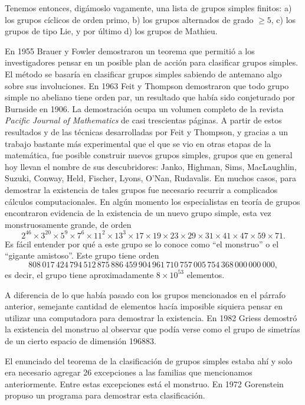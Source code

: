 Tenemos entonces,
digámoslo vagamente, una lista de grupos simples finitos: a) los grupos
cíclicos de orden primo, b) los grupos alternados de grado $\geq 5$, c) los
grupos de tipo Lie, y por último d) los grupos de Mathieu. 

En 1955 Brauer y Fowler demostraron un teorema que permitió a los investigadores
pensar en un posible plan de acción para clasificar grupos simples. El método 
se basaría en clasificar grupos simples sabiendo de antemano algo sobre sus 
involuciones.  
En 1963 Feit y Thompson demostraron que todo grupo simple no abeliano tiene orden par, 
un resultado que había sido conjeturado por Burnside en 1906. La demostración ocupa
un volumen completo de la revista \emph{Pacific Journal of Mathematics} de casi
trescientas páginas. A partir de estos resultados y de las técnicas desarrolladas
por Feit y Thompson, y gracias a un trabajo bastante más experimental 
que el que se vio en otras etapas de la matemática, 
fue posible construir nuevos grupos simples, grupos que en
general hoy llevan el nombre de sus descubridores: Janko, Highman, Sims,
MacLaughlin, Suzuki, Conway, Held, Fischer, Lyons, O'Nan, Rudavalis. En muchos
casos, para demostrar la existencia de tales grupos fue necesario recurrir a
complicados cálculos computacionales. En algún momento los especialistas en
teoría de grupos encontraron evidencia de la existencia de un nuevo grupo
simple, esta vez monstruosamente grande, de orden 
\[
	2^{46}\times 3^{20}\times 5^9\times 7^6\times 11^2\times 13^3\times 17\times 19\times 23\times 29\times 31\times 41\times 47\times 59\times 71. 
\]
Es fácil entender por qué a este grupo se lo conoce como ``el monstruo'' o el 
``gigante amistoso''. Este grupo tiene orden 
\[
808\,017\,424\,794\,512\,875\,886\,459\,904\,961\,710\,757\,005\,754\,368\,000\,000\,000,
\]
es decir, el grupo tiene aproximadamente $8\times 10^{53}$ elementos.

A diferencia de lo que había pasado con los grupos mencionados en el párrafo
anterior, semejante cantidad de elementos hacía imposible siquiera pensar en
utilizar una computadora para demostrar la existencia. En 1982 Griess demostró
la existencia del monstruo al observar que podía verse como el grupo de
simetrías de un cierto espacio de dimensión 196883. 

El enunciado del teorema de la clasificación de grupos simples estaba ahí y
solo era necesario agregar 26 excepciones a las familias que mencionamos
anteriormente. Entre estas excepciones está el monstruo. En 1972 Gorenstein
propuso un programa para demostrar esta clasificación. 

